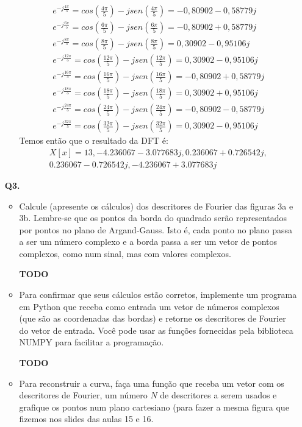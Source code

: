 \documentclass[12pt]{article}
\begin{document}
\begin{itemize}
\begin{itemize}
\begin{align*}
    &e^{-j\frac{4\pi}{5}} = cos(\frac{4\pi}{5}) - jsen(\frac{4\pi}{5}) = -0,80902 - 0,58779j &\\
    &e^{-j\frac{6\pi}{5}} = cos(\frac{6\pi}{5}) - jsen(\frac{6\pi}{5}) = -0,80902 + 0,58779j &\\
    &e^{-j\frac{8\pi}{5}} = cos(\frac{8\pi}{5}) - jsen(\frac{8\pi}{5}) = 0,30902  - 0,95106j &\\
    &e^{-j\frac{12\pi}{5}} = cos(\frac{12\pi}{5}) - jsen(\frac{12\pi}{5}) = 0,30902	-0,95106j &\\
    &e^{-j\frac{16\pi}{5}} = cos(\frac{16\pi}{5}) - jsen(\frac{16\pi}{5}) = -0,80902 + 0,58779j &\\
    &e^{-j\frac{18\pi}{5}} = cos(\frac{18\pi}{5}) - jsen(\frac{18\pi}{5}) = 0,30902 + 0,95106j &\\
    &e^{-j\frac{24\pi}{5}} = cos(\frac{24\pi}{5}) - jsen(\frac{24\pi}{5}) = -0,80902 - 0,58779j &\\
    &e^{-j\frac{32\pi}{5}} = cos(\frac{32\pi}{5}) - jsen(\frac{32\pi}{5}) = 0,30902	- 0,95106j&
\end{align*}
Temos então que o resultado da DFT é:
\begin{multline*}
    X[x] = 13, -4.236067-3.077683j, 0.236067+0.726542j, \\
           0.236067-0.726542j, -4.236067+3.077683j
\end{multline*}

\end{itemize}
%
%
%
\item[{\bf Q3.}] 
\begin{itemize}
\item Calcule (apresente os cálculos) dos descritores de Fourier das
  figuras 3a e 3b. Lembre-se que os pontos da
  borda do quadrado serão representados por pontos no plano de
  Argand-Gauss. Isto é, cada ponto no plano passa a ser um número
  complexo e a borda passa a ser um vetor de pontos complexos, como
  num sinal, mas com valores complexos.

\textbf{TODO}

\item Para confirmar que seus cálculos estão corretos, implemente um
  programa em Python que receba como entrada um vetor de números
  complexos (que são as coordenadas das bordas) e retorne os
  descritores de Fourier do vetor de entrada. Você pode usar as
  funções fornecidas pela biblioteca NUMPY para facilitar a
  programação.
  
\textbf{TODO}

\item Para reconstruir a curva, faça uma função que receba um vetor
  com os descritores de Fourier, um número $N$ de descritores a serem
  usados e grafique os pontos num plano cartesiano (para fazer a mesma 
figura que fizemos nos slides das aulas 15 e 16.


\end{itemize}
\end{itemize}
\end{document}
